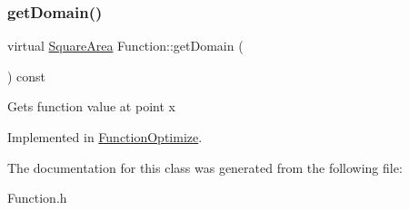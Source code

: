 \subsubsection{\texorpdfstring{get\+Domain()}{getDomain()}}
{\footnotesize\ttfamily virtual \hyperlink{class_square_area}{Square\+Area} Function\+::get\+Domain (\begin{DoxyParamCaption}{ }\end{DoxyParamCaption}) const\hspace{0.3cm}{\ttfamily [pure virtual]}}

Gets function value at point x 

Implemented in \hyperlink{class_function_optimize_a5b2a52f2851494a02fbd52b1862a98ae}{Function\+Optimize}.



The documentation for this class was generated from the following file\+:\begin{DoxyCompactItemize}
\item 
Function.\+h\end{DoxyCompactItemize}

